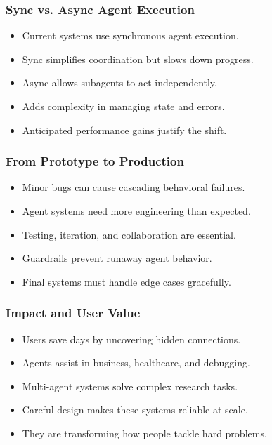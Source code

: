 \begin{frame}[fragile]\frametitle{Sync vs. Async Agent Execution}
    \begin{itemize}
        \item Current systems use synchronous agent execution.
        \item Sync simplifies coordination but slows down progress.
        \item Async allows subagents to act independently.
        \item Adds complexity in managing state and errors.
        \item Anticipated performance gains justify the shift.
    \end{itemize}
\end{frame}

\begin{frame}[fragile]\frametitle{From Prototype to Production}
    \begin{itemize}
        \item Minor bugs can cause cascading behavioral failures.
        \item Agent systems need more engineering than expected.
        \item Testing, iteration, and collaboration are essential.
        \item Guardrails prevent runaway agent behavior.
        \item Final systems must handle edge cases gracefully.
    \end{itemize}
\end{frame}

\begin{frame}[fragile]\frametitle{Impact and User Value}
    \begin{itemize}
        \item Users save days by uncovering hidden connections.
        \item Agents assist in business, healthcare, and debugging.
        \item Multi-agent systems solve complex research tasks.
        \item Careful design makes these systems reliable at scale.
        \item They are transforming how people tackle hard problems.
    \end{itemize}
\end{frame}


